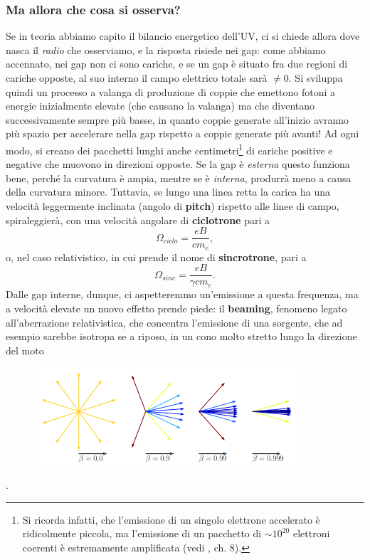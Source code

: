 \subsubsection{Ma allora che cosa si osserva?}
Se in teoria abbiamo capito il bilancio energetico dell'UV, ci si chiede allora dove nasca il \textit{radio} che osserviamo, e la risposta risiede nei gap:
come abbiamo accennato, nei gap non ci sono cariche, e se un gap è situato fra due regioni di cariche opposte, al suo interno il campo elettrico totale sarà $\not=0$. 
Si sviluppa quindi un processo a valanga di produzione di coppie che emettono fotoni a energie inizialmente elevate (che causano la valanga) ma che diventano successivamente sempre più basse, in quanto coppie generate all'inizio avranno più spazio per accelerare nella gap rispetto a coppie generate più avanti!
Ad ogni modo, si creano dei pacchetti lunghi anche centimetri\footnote{Si ricorda infatti, che l'emissione di un singolo elettrone accelerato è ridicolmente piccola, ma l'emissione di un pacchetto di $\sim10^{20}$ elettroni coerenti è estremamente amplificata (vedi \cite{Bradt}, ch. 8).} di cariche positive e negative che muovono in direzioni opposte.
Se la gap è \textit{esterna} questo funziona bene, perché la curvatura è ampia, mentre se è \textit{interna}, produrrà meno a causa della curvatura minore.
Tuttavia, se lungo una linea retta la carica ha una velocità leggermente inclinata (angolo di \textbf{pitch}) rispetto alle linee di campo, spiraleggierà, con una velocità angolare di \textbf{ciclotrone} pari a
\begin{equation}
    \Omega_{ciclo} = \frac{eB}{cm_e},
    \label{eq: ciclotrone}
\end{equation}
o, nel caso relativistico, in cui prende il nome di \textbf{sincrotrone}, pari a 
\begin{equation}
    \Omega_{sinc}=\frac{eB}{\gamma cm_e}.
    \label{eq: sincrotrone}
\end{equation}
Dalle gap interne, dunque, ci aspetteremmo un'emissione a questa frequenza, ma a velocità elevate un nuovo effetto prende piede: il \textbf{beaming}, fenomeno legato all'aberrazione relativistica, che concentra l'emissione di una sorgente, che ad esempio sarebbe isotropa se a riposo, in un cono molto stretto lungo la direzione del moto
\begin{figure}[h!]
    \centering
    \includegraphics[width=0.5\linewidth]{Immagini/beaming iso source.png}
    \label{fig: beaming sorgente isotropa}
\end{figure}.\\
